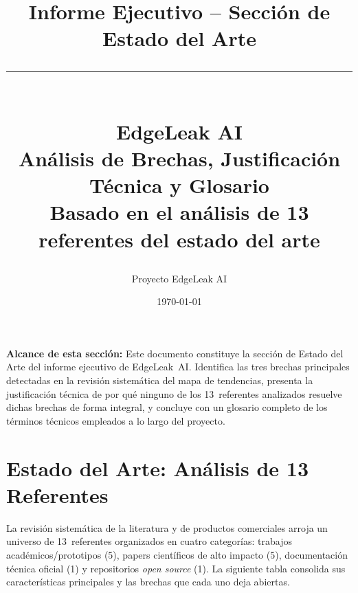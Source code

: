 \documentclass[12pt,a4paper]{article}
\title{
  \Huge\textbf{Informe Ejecutivo -- Sección de Estado del Arte}\\[0.5em]
  \textcolor{primaryblue}{\rule{\linewidth}{1.5pt}}\\[0.3em]
  \Large\textbf{EdgeLeak AI}\\[0.2em]
  \large Análisis de Brechas, Justificación Técnica y Glosario\\[0.5em]
  \normalsize Basado en el análisis de 13 referentes del estado del arte
}
\author{Proyecto EdgeLeak AI}
\date{\today}
\begin{document}
\maketitle
\thispagestyle{fancy}

\begin{mdframed}[linecolor=primaryblue,linewidth=1.5pt,backgroundcolor=blue!3]
\textbf{Alcance de esta sección:} Este documento constituye la sección de Estado del Arte
del informe ejecutivo de EdgeLeak~AI. Identifica las tres brechas principales detectadas
en la revisión sistemática del mapa de tendencias, presenta la justificación técnica de
por qué ninguno de los 13~referentes analizados resuelve dichas brechas de forma integral,
y concluye con un glosario completo de los términos técnicos empleados a lo largo del proyecto.
\end{mdframed}

\vspace{1em}
\tableofcontents
\newpage

\section{Estado del Arte: Análisis de 13 Referentes}

La revisión sistemática de la literatura y de productos comerciales arroja un universo
de 13~referentes organizados en cuatro categorías: trabajos académicos/prototipos (5),
papers científicos de alto impacto (5), documentación técnica oficial (1) y repositorios
\textit{open source} (1). La siguiente tabla consolida sus características principales y
las brechas que cada uno deja abiertas.
\end{document}
